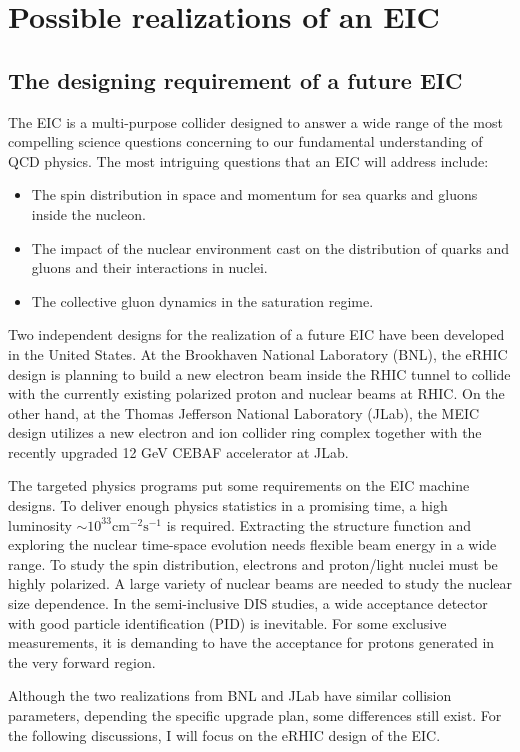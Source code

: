 \chapter{Possible realizations of an EIC} 
\label{chp:EIC}

\section{The designing requirement of a future EIC}
The EIC is a multi-purpose collider designed to answer a wide range
of the most compelling science questions concerning to our fundamental understanding of QCD physics. The most intriguing questions
that an EIC will address include:
\begin{itemize}
\item The spin distribution in space and momentum for sea quarks and gluons inside the nucleon.
\item The impact of the nuclear environment cast on the distribution of quarks and gluons and their interactions in nuclei.
\item The collective gluon dynamics in the saturation regime.
\end{itemize}
Two independent designs for the realization of a future EIC have been developed
in the United States. At the Brookhaven National Laboratory (BNL), the eRHIC
design is planning to build a new electron beam inside the RHIC tunnel to
collide with the currently existing polarized proton and nuclear beams at RHIC.
On the other hand, at the Thomas Jefferson National Laboratory (JLab), the MEIC
design utilizes a new electron and ion collider ring complex together with the
recently upgraded 12 GeV CEBAF accelerator at JLab.

The targeted physics programs put some requirements on the EIC machine designs.
To deliver enough physics statistics in a promising time, a high luminosity
$\sim 10^{33} \mathrm{cm}^{-2}\mathrm{s}^{-1}$ is required. Extracting the
structure function and exploring the nuclear time-space evolution needs flexible beam
energy in a wide range. To study the spin distribution, electrons and proton/light
nuclei must be highly polarized. A large variety of nuclear beams are needed to study
the nuclear size dependence. In the semi-inclusive DIS studies, a wide acceptance
detector with good particle identification (PID) is inevitable. For some exclusive
measurements, it is demanding to have the acceptance for protons generated in the
very forward region.

Although the two realizations from BNL and JLab have similar collision parameters,
depending the specific upgrade plan, some differences still exist. For the following
discussions, I will focus on the eRHIC design of the EIC. 


